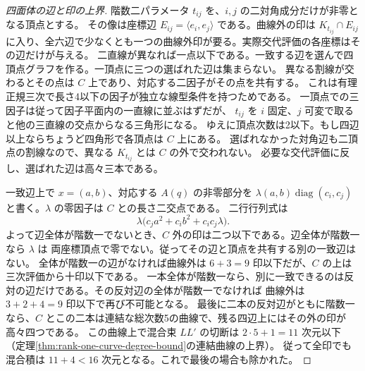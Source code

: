 \begin{proof}[四面体の辺と印の上界]
階数二パラメータ $t_{ij}$ を、$i,j$ の二対角成分だけが非零となる頂点とする。
その像は座標辺 $E_{ij}=\langle e_i,e_j\rangle$ である。曲線外の印は
$K_{t_{ij}}\cap E_{ij}$ に入り、全六辺で少なくとも一つの曲線外印が要る。実際交代評価の各座標はその辺だけが与える。
二直線が異なれば一点以下である。一致する辺を選んで四頂点グラフを作る。一頂点に三つの選ばれた辺は集まらない。
異なる割線が交わるとその点は $C$ 上であり、対応する二因子がその点を共有する。
これは有理正規三次で長さ4以下の因子が独立な線型条件を持つためである。
一頂点での三因子は従って因子平面内の一直線に並ぶはずだが、
$t_{ij}$ を $i$ 固定、$j$ 可変で取ると他の三直線の交点からなる三角形になる。
ゆえに頂点次数は2以下。もし四辺以上ならちょうど四角形で各頂点は $C$ 上にある。
選ばれなかった対角辺も二頂点の割線なので、異なる $K_{t_{ij}}$ とは $C$ の外で交われない。
必要な交代評価に反し、選ばれた辺は高々三本である。

一致辺上で $x=(a,b)$、対応する $A(q)$ の非零部分を
$\lambda(a,b)\operatorname{diag}(c_i,c_j)$ と書く。$\lambda$ の零因子は $C$ との長さ二交点である。
二行行列式は
\[
       \lambda\big(c_j a^2+c_i b^2+c_ic_j\lambda\big).
\]
よって辺全体が階数一でないとき、$C$ 外の印は二つ以下である。辺全体が階数一なら $\lambda$ は
両座標頂点で零でない。従ってその辺と頂点を共有する別の一致辺はない。
全体が階数一の辺がなければ曲線外は $6+3=9$ 印以下だが、$C$ の上は三次評価から十印以下である。
一本全体が階数一なら、別に一致できるのは反対の辺だけである。その反対辺の全体が階数一でなければ
曲線外は $3+2+4=9$ 印以下で再び不可能となる。
最後に二本の反対辺がともに階数一なら、$C$ とこの二本は連結な総次数5の曲線で、残る四辺上にはその外の印が高々四つである。
この曲線上で混合束 $LL'$ の切断は $2\cdot5+1=11$ 次元以下
（定理\ref{thm:rank-one-curve-degree-bound}の連結曲線の上界）。
従って全印でも混合積は $11+4<16$ 次元となる。これで最後の場合も除かれた。
\end{proof}
